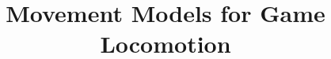 \documentclass[acmsmall,screen,review]{acmart}
\begin{document}
\title{Movement Models for Game Locomotion}









\maketitle

\end{document}

